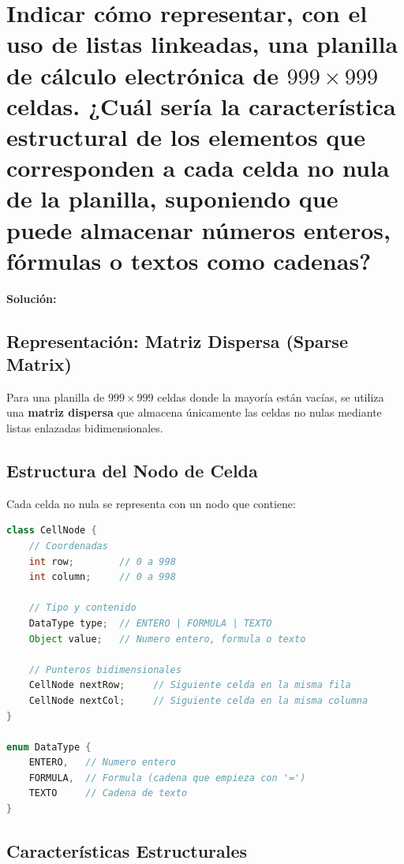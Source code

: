 \documentclass[12pt]{article}
\newcommand{\solucion}{%
    \vspace{0.8em}%
    \textbf{Solución:}%
}
\begin{document}
\section[Planilla de cálculo con listas linkeadas]{Indicar cómo representar, con el uso de listas linkeadas, una planilla de cálculo electrónica de $999 \times 999$ celdas. ¿Cuál sería la característica estructural de los elementos que corresponden a cada celda no nula de la planilla, suponiendo que puede almacenar números enteros, fórmulas o textos como cadenas?}
 
\solucion
 
\subsection*{Representación: Matriz Dispersa (Sparse Matrix)}
 
Para una planilla de $999 \times 999$ celdas donde la mayoría están vacías, se utiliza una \textbf{matriz dispersa} que almacena únicamente las celdas no nulas mediante listas enlazadas bidimensionales.
 
\subsection*{Estructura del Nodo de Celda}
 
Cada celda no nula se representa con un nodo que contiene:
 
\begin{lstlisting}[style=estilo_base, language=Java]
class CellNode {
    // Coordenadas
    int row;        // 0 a 998
    int column;     // 0 a 998
    
    // Tipo y contenido
    DataType type;  // ENTERO | FORMULA | TEXTO
    Object value;   // Numero entero, formula o texto
    
    // Punteros bidimensionales
    CellNode nextRow;     // Siguiente celda en la misma fila
    CellNode nextCol;     // Siguiente celda en la misma columna
}
 
enum DataType {
    ENTERO,   // Numero entero
    FORMULA,  // Formula (cadena que empieza con '=')
    TEXTO     // Cadena de texto
}
\end{lstlisting}
 
\subsection*{Características Estructurales}
 
\end{document}
